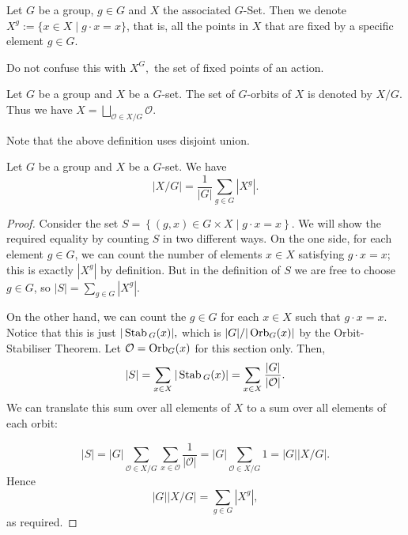 \begin{definition}
    Let $G$ be a group, $g \in G$ and $X$ the associated $G$-Set. Then we denote $X^{g} := \{x \in X \mid g \cdot x = x\}$, that is, all the points in $X$ that are fixed by a specific element $g\in G.$
\end{definition}
\begin{remark}
    Do not confuse this with $X^G,$ the set of fixed points of an action.
\end{remark}
\begin{definition}
  Let $G$ be a group and $X$ be a $G$-set. The set of $G$-orbits of $X$ is denoted by
  $X/G$. Thus we have $X=\bigsqcup_{\mathcal{O}\in X/G} \mathcal{O}$.
\end{definition}
\begin{remark}
    Note that the above definition uses disjoint union.
\end{remark}
\begin{theorem}
  Let $G$ be a group and $X$ be a $G$-set. We have 
  \[|X/G|=\frac{1}{|G|}\sum_{g\in G} |X^g|.\]
  \label{thm:notBurnside}
\end{theorem}
\begin{proof}
  Consider the set $S=\left\{ (g,x)\in G\times X \mid g \cdot x=x \right\}$. We will show the required equality by counting $S$ in two different ways.
  On the one side, for each element $g\in G$, we can count the number of elements $x\in X$ satisfying
  $g \cdot x=x$; this is exactly $|X^g|$ by definition. 
  But in the definition of $S$ we are free to choose $g \in G$, so 
  $|S|=\sum_{g\in G} |X^g|$.

  On the other hand, we can count the $g\in G$ for each $x\in X$ such that 
  $g\cdot x=x$. Notice that this is just $|\operatorname*{Stab}{}_G(x)|,$ which is $|G|/|\operatorname*{Orb}_G(x)|$ by the Orbit-Stabiliser Theorem. Let $\mathcal{O}=\operatorname*{Orb}_G(x)$ for this section only. Then, 
  $$
      |S|= \sum_{x\in X} |\operatorname*{Stab}{}_G(x)|= \sum_{x\in X} \frac{|G|}{|\mathcal{O}|}.
  $$
  We can translate this sum over all elements of $X$ to a sum over all elements of each orbit:
    
      
  $$ |S| = |G|
  \sum_{\mathcal{O}\in X/G} \sum_{x\in \mathcal{O}} \frac{1}{|\mathcal{O}|}= |G|\sum_{\mathcal{O}\in X/G} 1 = |G||X/G|.
  $$
  Hence
  \[|G||X/G| = \sum_{g\in G} |X^g|,\]
  as required.
\end{proof}


